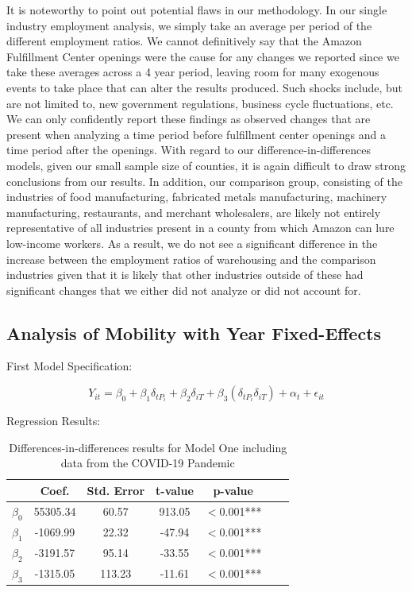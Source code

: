 \documentclass[11pt]{article}
\begin{document}
\-\hspace{0.5cm} It is noteworthy to point out potential flaws in our methodology. In our single industry employment analysis, we simply take an average per period of the different employment ratios. We cannot definitively say that the Amazon Fulfillment Center openings were the cause for any changes we reported since we take these averages across a 4 year period, leaving room for many exogenous events to take place that can alter the results produced. Such shocks include, but are not limited to, new government regulations, business cycle fluctuations, etc. We can only confidently report these findings as observed changes that are present when analyzing a time period before fulfillment center openings and a time period after the openings. With regard to our difference-in-differences models, given our small sample size of counties, it is again difficult to draw strong conclusions from our results. In addition, our comparison group, consisting of the industries of food manufacturing, fabricated metals manufacturing, machinery manufacturing, restaurants, and merchant wholesalers, are likely not entirely representative of all industries present in a county from which Amazon can lure low-income workers. As a result, we do not see a significant difference in the increase between the employment ratios of warehousing and the comparison industries given that it is likely that other industries outside of these had significant changes that we either did not analyze or did not account for. \\


\subsection{Analysis of Mobility with Year Fixed-Effects}

First Model Specification:

$$Y_{it} = \beta_0+ \beta_1 \delta_{tP_i} + \beta_2\delta_{iT} + \beta_3(\delta_{tP_i}\delta_{iT}) + \alpha_t+ \epsilon_{it}$$

Regression Results:

\begin{table}[H]
\centering
\begin{tabular}[H]{lcccccc}
\toprule
&Coef.&Std. Error&t-value&p-value &\\
\midrule
$\beta_0$& 55305.34 & 60.57 & 913.05 & $<$0.001***\\
$\beta_1$& -1069.99 & 22.32 & -47.94 & $<$0.001***\\
$\beta_2$& -3191.57 & 95.14 & -33.55 & $<$0.001***\\
$\beta_3$& -1315.05 & 113.23 & -11.61 & $<$0.001***\\
\bottomrule
\end{tabular}
\caption{Differences-in-differences results for Model One including data from the COVID-19 Pandemic}
\end{table}%
\end{document}
